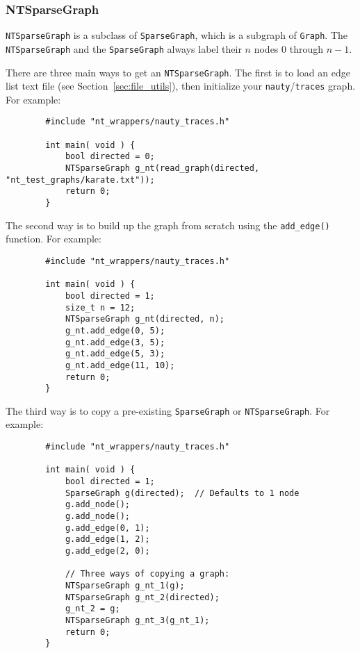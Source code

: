 \documentclass{article}
\begin{document}
\subsubsection{NTSparseGraph}

\verb|NTSparseGraph| is a subclass of \verb|SparseGraph|, which is a subgraph of \verb|Graph|. The \verb|NTSparseGraph| and the \verb|SparseGraph| always label their $n$ nodes 0 through $n - 1$.

There are three main ways to get an \verb|NTSparseGraph|. The first is to load an edge list text file (see Section~\ref{sec:file_utils}), then initialize your \verb|nauty|/\verb|traces| graph. For example:

\begin{verbatim}
        #include "nt_wrappers/nauty_traces.h"
        
        int main( void ) {
            bool directed = 0;
            NTSparseGraph g_nt(read_graph(directed, "nt_test_graphs/karate.txt"));
            return 0;
        }
\end{verbatim}

The second way is to build up the graph from scratch using the \verb|add_edge()| function. For example:

\vspace{-0.2cm}

\begin{verbatim}
        #include "nt_wrappers/nauty_traces.h"
        
        int main( void ) {
            bool directed = 1;
            size_t n = 12;
            NTSparseGraph g_nt(directed, n);
            g_nt.add_edge(0, 5);
            g_nt.add_edge(3, 5);
            g_nt.add_edge(5, 3);
            g_nt.add_edge(11, 10);
            return 0;
        }
\end{verbatim}

The third way is to copy a pre-existing \verb|SparseGraph| or \verb|NTSparseGraph|. For example:

\vspace{-0.2cm}

\begin{verbatim}
        #include "nt_wrappers/nauty_traces.h"
        
        int main( void ) {
            bool directed = 1;
            SparseGraph g(directed);  // Defaults to 1 node
            g.add_node();
            g.add_node();
            g.add_edge(0, 1);
            g.add_edge(1, 2);
            g.add_edge(2, 0);

            // Three ways of copying a graph:
            NTSparseGraph g_nt_1(g);
            NTSparseGraph g_nt_2(directed);
            g_nt_2 = g;
            NTSparseGraph g_nt_3(g_nt_1);
            return 0;
        }
\end{verbatim}
\end{document}
